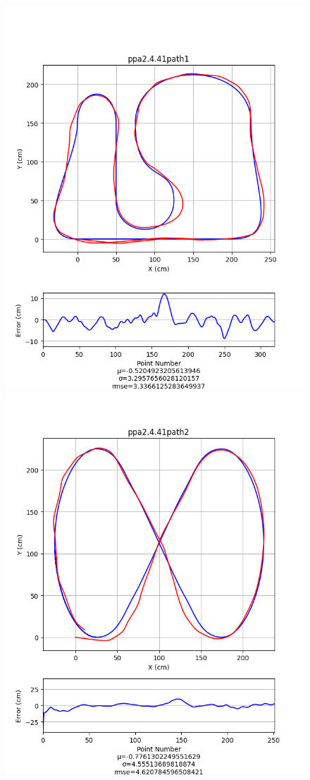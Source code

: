\documentclass[mla7]{mla}
\begin{document}
\begin{paper}
\begin{figure}[H]
\includegraphics[width=\linewidth]{pathData/ppa2path1}
\endminipage\hfill
{}
\includegraphics[width=\linewidth]{pathData/ppa2path2}

\end{figure}
\end{paper}
\end{document}

